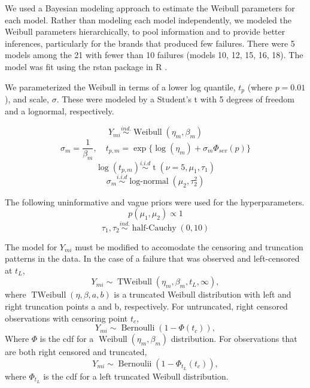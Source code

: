 \documentclass{article}
\begin{document}
We used a Bayesian modeling approach to estimate the Weibull parameters for each model. Rather than modeling each model independently, we modeled the Weibull parameters hierarchically, to pool information and to provide better inferences, particularly for the brands that produced few failures. There were 5 models among the 21 with fewer than 10 failures (models 10, 12, 15, 16, 18). The model was fit using the rstan package in R \cite{stan}.

We parameterized the Weibull in terms of a lower log quantile, $t_p$ (where $p=0.01$), and scale, $\sigma$. These were modeled by a Student's t with 5 degrees of freedom and a lognormal, respectively.

\[Y_{mi} \stackrel{ind.}{\sim} \operatorname{Weibull}(\eta_m, \beta_m)\]
\[\sigma_m = \frac{1}{\beta_m}, \quad t_{p,m} = \exp\{\log(\eta_m) + \sigma_m \Phi_{sev}(p)\}\]
\[\log(t_{p,m}) \stackrel{i.i.d}{\sim} \operatorname{t}(\nu = 5, \mu_1, \tau_1)\]
\[\sigma_m \stackrel{i.i.d}{\sim} \operatorname{log-normal}(\mu_2, \tau^2_2)\]

The following uninformative and vague priors were used for the hyperparameters.
\[p(\mu_1,\mu_2) \propto 1\]
\[\tau_1,\tau_2 \stackrel{ind.}{\sim} \operatorname{half-Cauchy}(0,10)\]

The model for $Y_{mi}$ must be modified to accomodate the censoring and truncation patterns in the data. In the case of a failure that was observed and left-censored at $t_L$,
\[Y_{mi} \sim \operatorname{TWeibull}(\eta_m, \beta_m, t_L, \infty),\]
where $\operatorname{TWeibull}(\eta,\beta,a,b)$ is a truncated Weibull distribution with left and right truncation points a and b, respectively. For untruncated, right censored observations with censoring point $t_c$,
\[Y_{mi} \sim \operatorname{Bernoulli}(1-\Phi(t_c)),\]
Where $\Phi$ is the cdf for a $\operatorname{Weibull}(\eta_m,\beta_m)$ distribution.
For observations that are both right censored and truncated,
\[Y_{mi} \sim \operatorname{Bernoulii}(1-\Phi_{t_L}(t_c)),\]
where $\Phi_{t_L}$ is the cdf for a left truncated Weibull distribution. 

 
\end{document}

